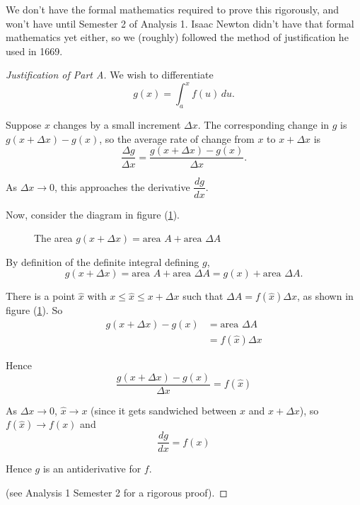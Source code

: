 We don't have the formal mathematics required to prove this rigorously, and won't have until Semester 2 of Analysis 1.  Isaac Newton didn't have that formal mathematics yet either, so we (roughly) followed the method of justification he used in 1669.


\begin{proof}[Justification of Part A]

We wish to differentiate
\[
 g(x) = \int_{a}^{x} f(u) \, du.
\]

Suppose $x$ changes by a small increment $\Delta x$.  The corresponding change in $g$ is $g(x + \Delta x) - g(x)$, so the average rate of change from $x$ to $x + \Delta x$ is
  \[
	  \frac{\Delta g}{\Delta x} = \frac{g(x + \Delta x) - g(x)}{\Delta x}.
	\]

As $\Delta x \rightarrow 0$, this approaches the derivative $\dfrac{dg}{dx}$.

Now, consider the diagram in figure (\ref{FTC_Proof}).

  \begin{figure}[H]
    \centering
    \def\svgwidth{0.8\columnwidth}
    
    \caption{The area $g(x+\Delta x) = \text{area $A$} + \text{area $\Delta A$}$}
    \label{FTC_Proof}
  \end{figure}
By definition of the definite integral defining $g$,
\[
g(x+\Delta x) = \text{area $A$} + \text{area $\Delta A$} = g(x) + \text{area $\Delta A$}.
\]

There is a point $\hat{x}$ with $x \leq \hat{x} \leq x + \Delta x$ such that $\Delta A = f(\hat{x})\Delta x$, as shown in figure (\ref{FTC_Proof}).  So
\begin{align*}
 g(x+\Delta x) - g(x) &= \text{area $\Delta A$} \\
 &= f(\hat{x})\Delta x
 \end{align*}

 Hence
 \[
  \dfrac{g(x+\Delta x) - g(x)}{\Delta x} = f(\hat{x})
 \]

 As $\Delta x \to 0$, $\hat{x} \to x$ (since it gets sandwiched between $x$ and $x + \Delta x$), so \(f(\hat{x}) \to f(x)\) and
 \[
  \dfrac{dg}{dx} = f(x)
 \]

Hence $g$ is an antiderivative for $f$.

(see Analysis 1 Semester 2 for a rigorous proof).

\end{proof}

